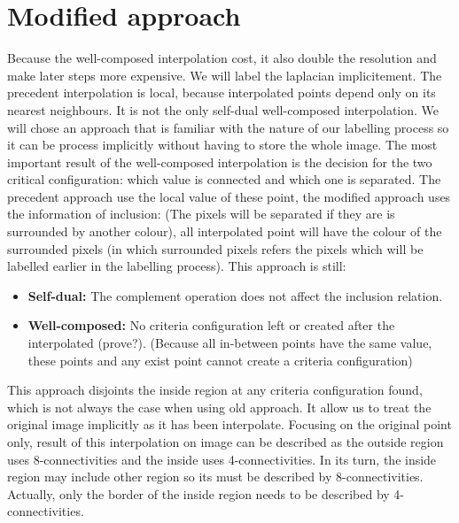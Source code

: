 \documentclass[12pt,a4paper,draft]{article}
\begin{document}
\section{Modified approach}

Because the well-composed interpolation cost, it also double the resolution and make later steps more expensive. We will label the laplacian implicitement. The precedent interpolation is local, because interpolated points depend only on its nearest neighbours. It is not the only self-dual well-composed interpolation. We will chose an approach that is familiar with the nature of our labelling process so it can be process implicitly without having to store the whole image. The most important result of the well-composed interpolation is the decision for the two critical configuration: which value is connected and which one is separated. The precedent approach use the local value of these point, the modified approach uses the information of inclusion: (The pixels will be separated if they are is surrounded by another colour), all interpolated point will have the colour of the surrounded pixels (in which surrounded pixels refers the pixels which will be labelled earlier in the labelling process). This approach is still: 

	\begin{itemize}
	
    \item \textbf{Self-dual:} The complement operation does not affect the inclusion relation. 

    \item \textbf{Well-composed:} No criteria configuration left or created after the interpolated (prove?). (Because all in-between points have the same value, these points and any exist point cannot create a criteria configuration) 

	\end{itemize}

This approach disjoints the inside region at any criteria configuration found, which is not always the case when using old approach. It allow us to treat the original image implicitly as it has been interpolate. Focusing on the original point only, result of this interpolation on image can be described as the outside region uses 8-connectivities and the inside uses 4-connectivities. In its turn, the inside region may include other region so its must be described by 8-connectivities. Actually, only the border of the inside region needs to be described by 4-connectivities. 
	
\end{document}
